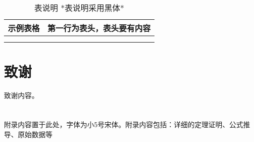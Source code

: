 \documentclass{cjc}
\begin{document}
\begin{table}[htb]
  \centering
  \caption{表说明 *表说明采用黑体*}
  \small
  \begin{tabular}{cc}
    \toprule
    示例表格 & 第一行为表头，表头要有内容 \\
    \midrule
    & \\
    \midrule
    & \\
    \bottomrule
  \end{tabular}
\end{table}





\section*{致谢}

致谢内容。


\nocite{*}






\appendix

\section{}

附录内容置于此处，字体为小5号宋体。附录内容包括：详细的定理证明、公式推导、原始数据等










\end{document}
